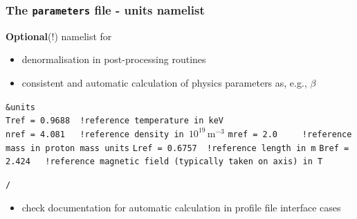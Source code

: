 \documentclass[10pt]{beamer}
\begin{document}

\begin{frame}[fragile]
  \frametitle{The {\tt parameters} file - units namelist}

\begin{block}

{\bf Optional}(!) namelist for 
\begin{itemize}
 \item denormalisation in post-processing routines
 \item consistent and automatic calculation of physics parameters as, e.g., $\beta$
\end{itemize}

\begin{block}

\verb|&units|\\
\verb|Tref = 0.9688  !reference temperature in keV|\\
\verb|nref = 4.081   !reference density in |$10^{19}\,\textrm{m}^{-3}$
\verb|mref = 2.0     !reference mass in proton mass units|
\verb|Lref = 0.6757  !reference length in m|
\verb|Bref = 2.424   !reference magnetic field (typically taken on axis) in T|

\verb|/|
\end{block}
\begin{itemize}
 \item check documentation for automatic calculation in profile file interface cases
\end{itemize}

\end{block}

\end{frame}

\end{document}
